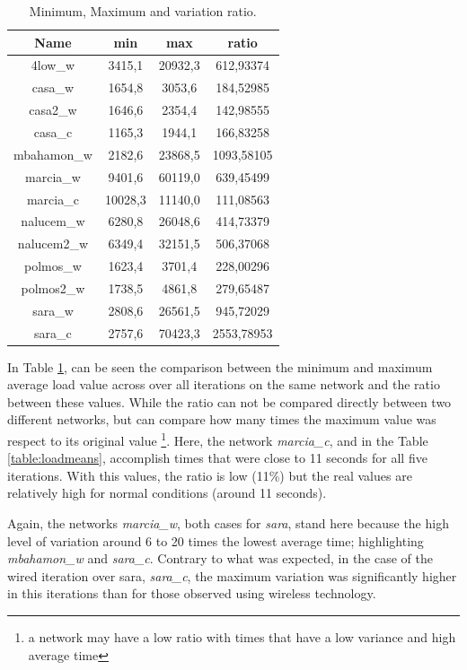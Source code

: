 \begin{table}[ht]
\begin{center}
\begin{tabular}{|c||c|c|c||}
 \hline
Name 			& min		& max		& ratio  	\\ \hline \hline
4low\_w 		& 3415,1	& 20932,3	& 612,93374 \\ \hline 
casa\_w 		& 1654,8	& 3053,6	& 184,52985 \\ \hline 
casa2\_w		& 1646,6	& 2354,4	& 142,98555	\\ \hline 
casa\_c			& 1165,3	& 1944,1	& 166,83258	\\ \hline 
mbahamon\_w		& 2182,6	& 23868,5	& 1093,58105\\ \hline 
marcia\_w		& 9401,6	& 60119,0	& 639,45499	\\ \hline 
marcia\_c		& 10028,3	& 11140,0	& 111,08563	\\ \hline 
nalucem\_w 		& 6280,8	& 26048,6	& 414,73379	\\ \hline 
nalucem2\_w 	& 6349,4	& 32151,5	& 506,37068	\\ \hline 
polmos\_w 		& 1623,4	& 3701,4	& 228,00296	\\ \hline 
polmos2\_w 		& 1738,5	& 4861,8	& 279,65487	\\ \hline 
sara\_w 		& 2808,6	& 26561,5	& 945,72029	\\ \hline 
sara\_c 		& 2757,6	& 70423,3	& 2553,78953\\ \hline 
\end{tabular}
\caption[Page Benchmark: Minimum, Maximum and variation ratio.]{Minimum, Maximum and variation ratio.}
\label{table:varatio}
\end{center}
\end{table}

In Table \ref{table:varatio}, can be seen the comparison between the minimum
and maximum average load value across over all iterations on the same network
and the ratio between these values. While the ratio can not be compared
directly between two different networks, but can compare how many times the
maximum value was respect to its original value \footnote{a network may have a
low ratio with times that have a low variance and high average time}. Here,
the network \textit{marcia\_c}, and in the Table \ref{table:loadmeans},
accomplish times that were close to 11 seconds for all five iterations. With
this values, the ratio is low (11\%) but the real values are relatively high
for normal conditions (around 11 seconds).

Again, the networks \textit{marcia\_w}, both cases for \textit{sara}, stand
here because the high level of variation around 6 to 20 times the lowest
average time; highlighting \textit{mbahamon\_w} and \textit{sara\_c}. Contrary
to what was expected, in the case of the wired iteration over sara,
\textit{sara\_c}, the maximum variation was significantly higher in this
iterations than for those observed using wireless technology.

